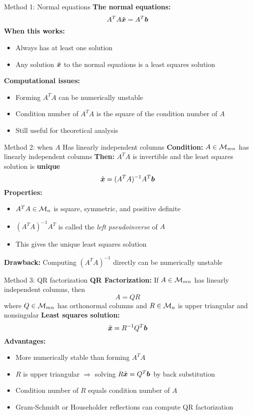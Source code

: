 \documentclass[aspectratio=169]{beamer}\usepackage[]{graphicx}\usepackage[]{xcolor}
\begin{document}
\begin{frame}{Method 1: Normal equations}
\textbf{The normal equations:}
$$A^TA\tilde{\bm{x}} = A^T\bm{b}$$
\vfill
\textbf{When this works:}
\begin{itemize}
\item Always has at least one solution
\item Any solution $\tilde{\bm{x}}$ to the normal equations is a least squares solution
\end{itemize}
\vfill
\textbf{Computational issues:}
\begin{itemize}
\item Forming $A^TA$ can be numerically unstable
\item Condition number of $A^TA$ is the square of the condition number of $A$
\item Still useful for theoretical analysis
\end{itemize}
\end{frame}

\begin{frame}{Method 2: when $A$ Has linearly independent columns}
\textbf{Condition:} $A\in\mathcal{M}_{mn}$ has linearly independent columns
\vfill
\textbf{Then:} $A^TA$ is invertible and the least squares solution is \textbf{unique}
$$\tilde{\bm{x}} = (A^TA)^{-1}A^T\bm{b}$$
\vfill
\textbf{Properties:}
\begin{itemize}
\item $A^TA \in \mathcal{M}_n$ is square, symmetric, and positive definite
\item $(A^TA)^{-1}A^T$ is called the \emph{left pseudoinverse} of $A$
\item This gives the unique least squares solution
\end{itemize}
\vfill
\textbf{Drawback:} Computing $(A^TA)^{-1}$ directly can be numerically unstable
\end{frame}

\begin{frame}{Method 3: QR factorization}
\textbf{QR Factorization:} If $A\in\mathcal{M}_{mn}$ has linearly independent columns, then
$$A = QR$$
where $Q\in\mathcal{M}_{mn}$ has orthonormal columns and $R\in\mathcal{M}_n$ is upper triangular and nonsingular
\vfill
\textbf{Least squares solution:}
$$\tilde{\bm{x}} = R^{-1}Q^T\bm{b}$$
\vfill
\textbf{Advantages:}
\begin{itemize}
\item More numerically stable than forming $A^TA$
\item $R$ is upper triangular $\Rightarrow$ solving $R\tilde{\bm{x}} = Q^T\bm{b}$ by back substitution
\item Condition number of $R$ equals condition number of $A$
\item Gram-Schmidt or Householder reflections can compute QR factorization
\end{itemize}
\end{frame}
\end{document}
